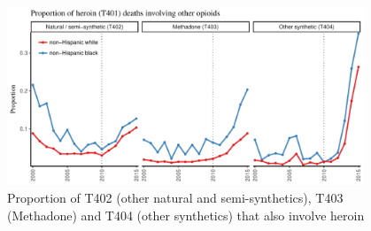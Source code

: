 \documentclass[12pt, a4paper]{article}
\begin{document}
\begin{figure}[h!]
\includegraphics[width=0.95\textwidth]{./plots/paper_fig9_t401_combos_v.pdf} 
 \caption{Proportion of T402 (other natural and semi-synthetics), T403 (Methadone) and T404 (other synthetics) that also involve heroin}
 \label{fig:401}
\end{figure}


%
%
%
\end{document}
